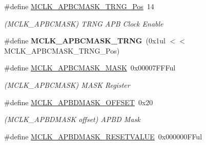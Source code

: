 \begin{DoxyCompactItemize}
\item 
\hypertarget{group___s_a_m_l21___m_c_l_k_ga398240eb1bf125624011e74222087b4f}{}\#define \hyperlink{group___s_a_m_l21___m_c_l_k_ga398240eb1bf125624011e74222087b4f}{M\+C\+L\+K\+\_\+\+A\+P\+B\+C\+M\+A\+S\+K\+\_\+\+T\+R\+N\+G\+\_\+\+Pos}~14\label{group___s_a_m_l21___m_c_l_k_ga398240eb1bf125624011e74222087b4f}

\begin{DoxyCompactList}\small\item\em (M\+C\+L\+K\+\_\+\+A\+P\+B\+C\+M\+A\+S\+K) T\+R\+N\+G A\+P\+B Clock Enable \end{DoxyCompactList}\item 
\hypertarget{group___s_a_m_l21___m_c_l_k_ga1a40fe05d77739123054498e7b303d3b}{}\#define {\bfseries M\+C\+L\+K\+\_\+\+A\+P\+B\+C\+M\+A\+S\+K\+\_\+\+T\+R\+N\+G}~(0x1ul $<$$<$ M\+C\+L\+K\+\_\+\+A\+P\+B\+C\+M\+A\+S\+K\+\_\+\+T\+R\+N\+G\+\_\+\+Pos)\label{group___s_a_m_l21___m_c_l_k_ga1a40fe05d77739123054498e7b303d3b}

\item 
\hypertarget{group___s_a_m_l21___m_c_l_k_gaecd8f6d7a986889c2f43a65a506bd42e}{}\#define \hyperlink{group___s_a_m_l21___m_c_l_k_gaecd8f6d7a986889c2f43a65a506bd42e}{M\+C\+L\+K\+\_\+\+A\+P\+B\+C\+M\+A\+S\+K\+\_\+\+M\+A\+S\+K}~0x00007\+F\+F\+Ful\label{group___s_a_m_l21___m_c_l_k_gaecd8f6d7a986889c2f43a65a506bd42e}

\begin{DoxyCompactList}\small\item\em (M\+C\+L\+K\+\_\+\+A\+P\+B\+C\+M\+A\+S\+K) M\+A\+S\+K Register \end{DoxyCompactList}\item 
\hypertarget{group___s_a_m_l21___m_c_l_k_ga7a00f8f628fc059b0ffcc36d2343c212}{}\#define \hyperlink{group___s_a_m_l21___m_c_l_k_ga7a00f8f628fc059b0ffcc36d2343c212}{M\+C\+L\+K\+\_\+\+A\+P\+B\+D\+M\+A\+S\+K\+\_\+\+O\+F\+F\+S\+E\+T}~0x20\label{group___s_a_m_l21___m_c_l_k_ga7a00f8f628fc059b0ffcc36d2343c212}

\begin{DoxyCompactList}\small\item\em (M\+C\+L\+K\+\_\+\+A\+P\+B\+D\+M\+A\+S\+K offset) A\+P\+B\+D Mask \end{DoxyCompactList}\item 
\hypertarget{group___s_a_m_l21___m_c_l_k_gaffe228d4015871770d9c2ac2d3e23349}{}\#define \hyperlink{group___s_a_m_l21___m_c_l_k_gaffe228d4015871770d9c2ac2d3e23349}{M\+C\+L\+K\+\_\+\+A\+P\+B\+D\+M\+A\+S\+K\+\_\+\+R\+E\+S\+E\+T\+V\+A\+L\+U\+E}~0x000000\+F\+Ful\label{group___s_a_m_l21___m_c_l_k_gaffe228d4015871770d9c2ac2d3e23349}


\end{DoxyCompactItemize}

